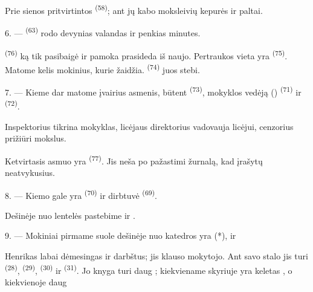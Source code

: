 Prie sienos pritvirtintos  \textsuperscript{(58)}; ant jų kabo
moksleivių kepurės ir paltai.

\VUsaut{5.2mm}
\VUsaut{3.6mm}

6. ---  \textsuperscript{(63)} rodo devynias valandas ir penkias
minutes.

 \textsuperscript{(76)} ką tik pasibaigė ir pamoka prasideda iš
naujo. Pertraukos vieta yra  \textsuperscript{(75)}. Matome kelis
mokinius, kurie žaidžia.  \textsuperscript{(74)} juos stebi.

7. --- Kieme dar matome įvairius asmenis, būtent 
\textsuperscript{(73)}, mokyklos vedėją ()
\textsuperscript{(71)} ir  \textsuperscript{(72)}.

Inspektorius tikrina mokyklas, licėjaus direktorius vadovauja licėjui, cenzorius
prižiūri mokslus.

Ketvirtasis asmuo yra  \textsuperscript{(77)}. Jis neša po
pažastimi žurnalą, kad įrašytų neatvykusius.

8. --- Kiemo gale yra  \textsuperscript{(70)} ir
dirbtuvė  \textsuperscript{(69)}.

Dešinėje nuo lentelės pastebime  ir 
.


\VUsaut{2.4mm}

\VUsaut{3.0mm}

9. --- Mokiniai pirmame suole dešinėje nuo katedros yra  (*),
 ir 

Henrikas labai dėmesingas ir darbštus; jis klauso mokytojo. Ant savo stalo jis turi
 \textsuperscript{(28)},  \textsuperscript{(29)},
 \textsuperscript{(30)} ir  \textsuperscript{(31)}. Jo
knyga turi daug ; kiekviename skyriuje yra keletas
, o kiekvienoje  daug 

